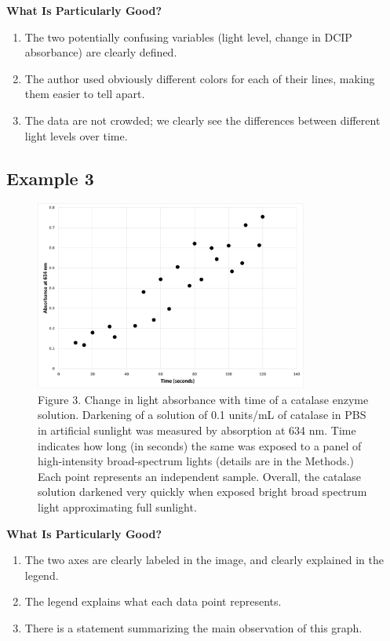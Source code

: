 \documentclass[
]{book}
\providecommand{\tightlist}{%
  \setlength{\itemsep}{0pt}\setlength{\parskip}{0pt}}
\begin{document}
\textbf{What Is Particularly Good?}

\begin{enumerate}
\def\labelenumi{\arabic{enumi}.}
\tightlist
\item
  The two potentially confusing variables (light level, change in DCIP absorbance) are clearly defined.
\item
  The author used obviously different colors for each of their lines, making them easier to tell apart.
\item
  The data are not crowded; we clearly see the differences between different light levels over time.
\end{enumerate}

\hypertarget{example-3-8}{%
\subsection{Example 3}\label{example-3-8}}

\begin{figure}
\centering
\includegraphics[width=0.8\textwidth,height=\textheight]{images/Scatter_data1.png}
\caption{Figure 3. Change in light absorbance with time of a catalase enzyme solution. Darkening of a solution of 0.1 units/mL of catalase in PBS in artificial sunlight was measured by absorption at 634 nm. Time indicates how long (in seconds) the same was exposed to a panel of high-intensity broad-spectrum lights (details are in the Methods.) Each point represents an independent sample. Overall, the catalase solution darkened very quickly when exposed bright broad spectrum light approximating full sunlight.}
\end{figure}

\textbf{What Is Particularly Good?}

\begin{enumerate}
\def\labelenumi{\arabic{enumi}.}
\tightlist
\item
  The two axes are clearly labeled in the image, and clearly explained in the legend.
\item
  The legend explains what each data point represents.
\item
  There is a statement summarizing the main observation of this graph.
\end{enumerate}
\end{document}
